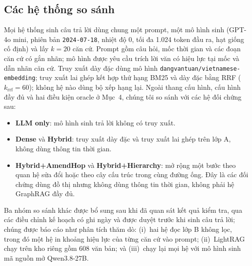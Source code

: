 \documentclass[11pt,a4paper]{article}
\begin{document}
\subsection{Các hệ thống so sánh}
Mọi hệ thống sinh câu trả lời dùng chung một prompt, một mô hình sinh (GPT-4o mini, phiên bản \texttt{2024-07-18}, nhiệt độ 0, tối đa 1.024 token đầu ra, hạt giống cố định) và lấy $k=20$ căn cứ. Prompt gồm câu hỏi, mốc thời gian và các đoạn căn cứ có gắn nhãn; mô hình được yêu cầu trích lời văn có hiệu lực tại mốc và dẫn nhãn căn cứ. Truy xuất dày đặc dùng mô hình \texttt{dangvantuan/vietnamese-embedding}; truy xuất lai ghép kết hợp thứ hạng BM25 và dày đặc bằng RRF ($k_{\mathrm{rrf}}=60$); không hệ nào dùng bộ xếp hạng lại. Ngoài thang cấu hình, cấu hình đầy đủ và hai điều kiện oracle ở Mục~4, chúng tôi so sánh với các hệ đối chứng sau:
\begin{itemize}
  \item \textbf{LLM only}: mô hình sinh trả lời không có truy xuất.
  \item \textbf{Dense} và \textbf{Hybrid}: truy xuất dày đặc và truy xuất lai ghép trên lớp A, không dùng thông tin thời gian.
  \item \textbf{Hybrid+AmendHop} và \textbf{Hybrid+Hierarchy}: mở rộng một bước theo quan hệ sửa đổi hoặc theo cây cấu trúc trong cùng đường ống. Đây là các đối chứng dùng đồ thị nhưng không dùng thông tin thời gian, không phải hệ GraphRAG đầy đủ.
\end{itemize}
Ba nhóm so sánh khác được bổ sung sau khi đã quan sát kết quả kiểm tra, qua các điều chỉnh kế hoạch có ghi ngày và được duyệt trước khi sinh câu trả lời; chúng được báo cáo như phân tích thăm dò: (i)~hai hệ đọc lớp B không lọc, trong đó một hệ in khoảng hiệu lực của từng căn cứ vào prompt; (ii)~LightRAG \citep{guo2025lightrag} chạy trên kho riêng gồm 608 văn bản; và (iii)~chạy lại mọi hệ với mô hình sinh mã nguồn mở Qwen3.8-27B.
\end{document}
